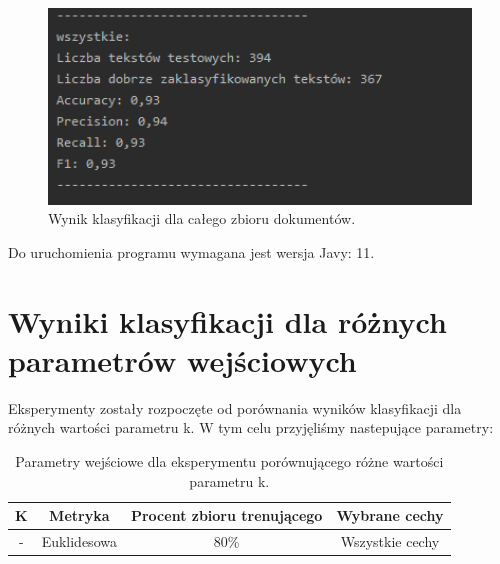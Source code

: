 \documentclass{classrep}
\begin{document}
\begin{figure}[h!]
 \centering
 \includegraphics[width=14cm]{wynik.png}
 \vspace{-0.3cm}
 \caption{Wynik klasyfikacji dla całego zbioru dokumentów.}
 \label{Wynik klasyfikacji.}
\end{figure}
\newpage

Do uruchomienia programu wymagana jest wersja Javy: 11. 



\section{Wyniki klasyfikacji dla różnych parametrów wejściowych}

Eksperymenty zostały rozpoczęte od porównania wyników klasyfikacji dla różnych wartości parametru k.
W tym celu przyjęliśmy nastepujące parametry:
 
\begin{table}[h!]
\caption{Parametry wejściowe dla eksperymentu porównującego różne wartości parametru k. }
\centering
\vspace{0.1cm}
 \begin{tabular}{c c c c}
    \textbf{K} & \textbf{Metryka}   & \textbf{Procent zbioru trenującego}  & \textbf{Wybrane cechy}   \\
\hline
- & Euklidesowa & 80\% &  Wszystkie cechy\\
\end {tabular}
\label {Parametry wejściowe dla eksperymentu porównującego różne wartości parametru k. }
\end{table}
\end{document}
